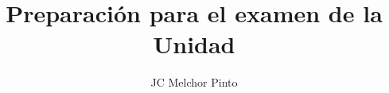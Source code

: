 \documentclass[12pt,addpoints]{repaso}
\title{Preparación para el examen de la Unidad}
\author{JC Melchor Pinto}
\begin{document}
\INFO%
\ejemplosboxed[]
\begin{questions}
    \questionboxed[20]{}
    \questionboxed[10]{}
    \ejemplosboxed[]
    \questionboxed[10]{}
    \questionboxed[4]{}
    \questionboxed[4]{}
    \questionboxed[4]{}
    \ejemplosboxed[]
    \questionboxed[5]{}
    \ejemplosboxed[]
    \questionboxed[5]{}
    \questionboxed[4]{}
    \questionboxed[4]{}
    \questionboxed[30]{}
\end{questions}
\end{document}
